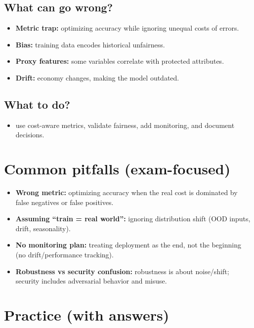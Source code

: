 \documentclass[11pt]{article}
\begin{document}
\subsection{What can go wrong?}
\begin{itemize}[leftmargin=*]
  \item \textbf{Metric trap:} optimizing accuracy while ignoring unequal costs of errors.
  \item \textbf{Bias:} training data encodes historical unfairness.
  \item \textbf{Proxy features:} some variables correlate with protected attributes.
  \item \textbf{Drift:} economy changes, making the model outdated.
\end{itemize}
\subsection{What to do?}
\begin{itemize}[leftmargin=*]
  \item use cost-aware metrics, validate fairness, add monitoring, and document decisions.
\end{itemize}

\section{Common pitfalls (exam-focused)}
\begin{itemize}[leftmargin=*]
  \item \textbf{Wrong metric:} optimizing accuracy when the real cost is dominated by false negatives or false positives.
  \item \textbf{Assuming ``train = real world'':} ignoring distribution shift (OOD inputs, drift, seasonality).
  \item \textbf{No monitoring plan:} treating deployment as the end, not the beginning (no drift/performance tracking).
  \item \textbf{Robustness vs security confusion:} robustness is about noise/shift; security includes adversarial behavior and misuse.
\end{itemize}

\section{Practice (with answers)}
\end{document}
